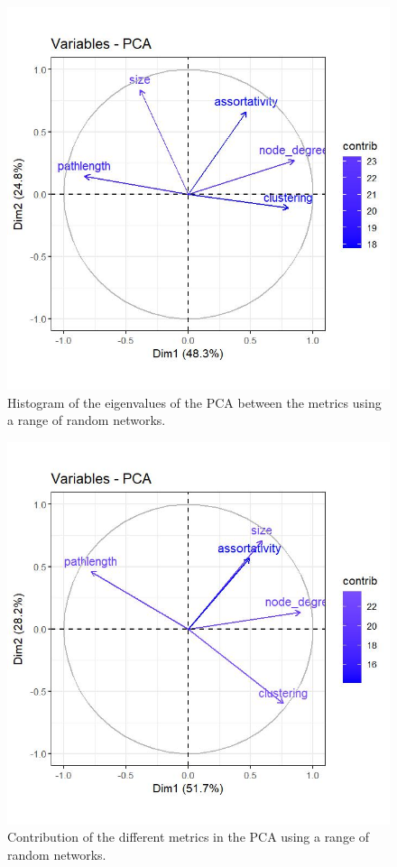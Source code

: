 \documentclass[
]{article}
\begin{document}
\begin{figure}[!H]

{\centering \includegraphics{./Figures/unnamed-chunk-83-1} 

}

\caption{Histogram of the eigenvalues of the PCA between the metrics using a range of random networks.}\label{fig:unnamed-chunk-83}
\end{figure}

\begin{figure}[!H]

{\centering \includegraphics{./Figures/unnamed-chunk-84-1} 

}

\caption{Contribution of the different metrics in the PCA using a range of random networks.}\label{fig:unnamed-chunk-84}
\end{figure}
\end{document}
